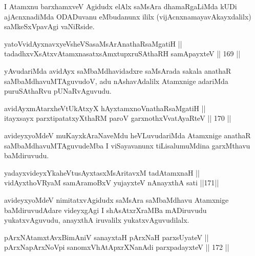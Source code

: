 \begin{artha}
I Atamxnu barxhamxveV Agidudx elAlx saMsAra dhamaRgaLiMda kUDi
ajAcnxnadiMda ODADuvanu eMbudanunx ililx (vijAcnxnamayavAkayxdalilx)
saMkeSxVpavAgi vaNiRside.
\end{artha}


\begin{shl}
yatoV\s vidAyxnavxyeV\s sheVSasaMsArAnathaRsaMgatiH || \\
tadadhxvXsAtxvAtamxnasatxsAmxtupxruSAthaRH samApayxteV \hfill || 169 ||  
\end{shl}

\begin{artha}
yAvudariMda avidAyx saMbaMdhavidadxre saMsArada sakala anathaR
saMbaMdhavuMTAguvudoV, adu nAshavAdalilx Atamxnige adariMda
puruSAthaRvu pUNaRvAguvudu.
\end{artha}

\begin{shl}
avidAyxmAtarxheVtUkAtxyX hAyxtamxnoV\s nathaRsaMgatiH || \\
itayxsayx parxtipatatxyXthaRM paroV garxnothxV\s vatAyaRteV \hfill || 170 ||  
\end{shl}

\begin{artha}
avideyxyoMdeV muKayxkAraNaveMdu heVLuvudariMda Atamxnige anathaR
saMbaMdhavuMTAguvudeMba I viSayavanunx tiLisalu\break muMdina garxMthavu
baMdiruvudu.
\end{artha}


\begin{shl}
yadayxvideyxYkaheVtusAyxtasxMsAritavxM tadA\s \s tamxnaH ||  \\
vidAyxthoVR\s yaM samAramoBxV yujayxteV nAnayxthA sati \hfill ||171||  
\end{shl}

\begin{artha}
avideyxyoMdeV nimitatxvAgidudx saMsAra saMbaMdhavu Atamxnige
baMdiruvudAdare videyxgAgi I shAsAtxrXraMBa mADiruvudu yukatxvAguvudu,
anayxthA iruvalilx yukatxvAguvudilalx.
\end{artha}


\begin{shl}
pArxNAtamxtAvxBimAniV sanayxtaH pArxNaH parxsUyateV || \\
pArxNapArxNoV\s pi sanomxVhAtApxrXNanAdi parxpadayxteV \hfill || 172 ||  
\end{shl}


